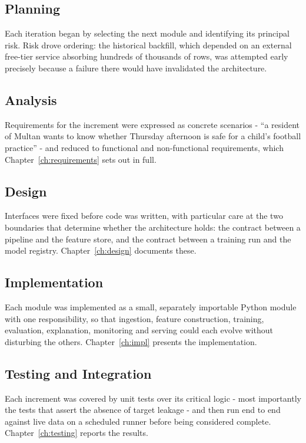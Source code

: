 
\subsection{Planning}
Each iteration began by selecting the next module and identifying its principal
risk. Risk drove ordering: the historical backfill, which depended on an external
free-tier service absorbing hundreds of thousands of rows, was attempted early
precisely because a failure there would have invalidated the architecture.

\subsection{Analysis}
Requirements for the increment were expressed as concrete scenarios - ``a
resident of Multan wants to know whether Thursday afternoon is safe for a child's
football practice'' - and reduced to functional and non-functional requirements,
which Chapter~\ref{ch:requirements} sets out in full.

\subsection{Design}
Interfaces were fixed before code was written, with particular care at the two
boundaries that determine whether the architecture holds: the contract between a
pipeline and the feature store, and the contract between a training run and the
model registry. Chapter~\ref{ch:design} documents these.

\subsection{Implementation}
Each module was implemented as a small, separately importable Python module with
one responsibility, so that ingestion, feature construction, training,
evaluation, explanation, monitoring and serving could each evolve without
disturbing the others. Chapter~\ref{ch:impl} presents the implementation.

\subsection{Testing and Integration}
Each increment was covered by unit tests over its critical logic - most
importantly the tests that assert the absence of target leakage - and then run
end to end against live data on a scheduled runner before being considered
complete. Chapter~\ref{ch:testing} reports the results.

